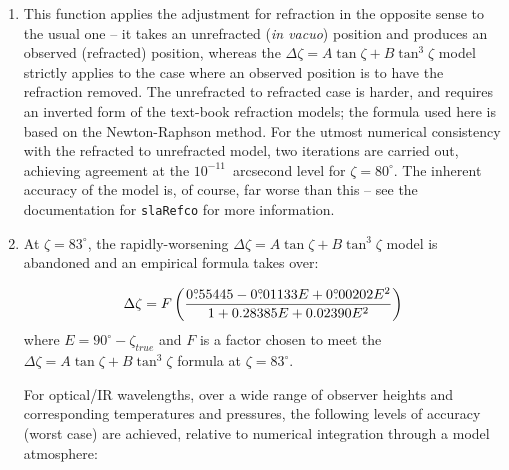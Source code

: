 \documentclass[11pt,fleqn,twoside]{article}
\renewcommand{\_}{{\tt\char'137}}     %
\begin{document}
{
 \begin{enumerate}
  \item This function applies the adjustment for refraction in the
        opposite sense to the usual one -- it takes an unrefracted
        ({\it in vacuo}\/) position and produces an observed (refracted)
        position, whereas the
        $\Delta \zeta = A \tan \zeta + B \tan^{3} \zeta$
        model strictly
        applies to the case where an observed position is to have the
        refraction removed.  The unrefracted to refracted case is
        harder, and requires an inverted form of the text-book
        refraction models;  the formula used here is based on the
        Newton-Raphson method.  For the utmost numerical consistency
        with the refracted to unrefracted model, two iterations are
        carried out, achieving agreement at the $10^{-11}$~arcsecond level
        for $\zeta=80^\circ$.  The inherent accuracy of the model
        is, of course, far worse than this -- see the documentation for
        {\tt slaRefco} for more information.
  \item At $\zeta=83^\circ$, the rapidly-worsening
        $\Delta \zeta = A \tan \zeta + B \tan^{3} \zeta$
        model is abandoned and an empirical formula takes over:
 
          \[\Delta \zeta = F \left(
  \frac{0^\circ\hspace{-0.37em}.\hspace{0.02em}55445
                - 0^\circ\hspace{-0.37em}.\hspace{0.02em}01133 E
                          + 0^\circ\hspace{-0.37em}.\hspace{0.02em}00202 E^2}
             {1 + 0.28385 E +0.02390 E^2} \right) \]
        where $E=90^\circ-\zeta_{true}$
        and $F$ is a factor chosen to meet the
        $\Delta \zeta = A \tan \zeta + B \tan^{3} \zeta$
        formula at $\zeta=83^\circ$.
 
        For optical/IR wavelengths, over a wide range of observer heights
        and corresponding temperatures and pressures, the following levels
        of accuracy (worst case) are achieved,
        relative to numerical integration through a model atmosphere:
 

\end{enumerate}}
\end{document}
